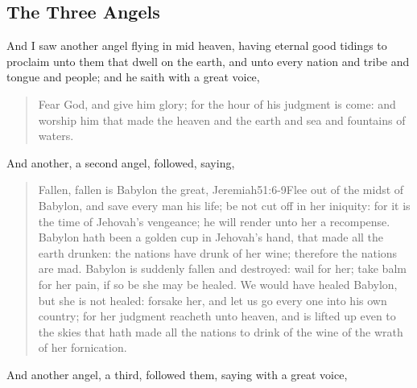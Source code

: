 \subsection*{The Three Angels}
And I saw another angel flying in mid heaven, having eternal good tidings to proclaim unto them that dwell on the earth, and unto every nation and tribe and tongue and people; 
and he saith with a great voice,
\begin{quote}
Fear God, and give him glory; for the hour of his judgment is come: and worship him that made the heaven and the earth and sea and fountains of waters.
\end{quote}
And another, a second angel, followed, saying,
\begin{quote}
Fallen, fallen is Babylon the great,%
				  {Jeremiah}{51:6-9}{Flee out of the midst of Babylon, and save every man his life; be not cut off in her iniquity: for it is the time of Jehovah’s vengeance; he will render unto her a recompense. Babylon hath been a golden cup in Jehovah’s hand, that made all the earth drunken: the nations have drunk of her wine; therefore the nations are mad. Babylon is suddenly fallen and destroyed: wail for her; take balm for her pain, if so be she may be healed. We would have healed Babylon, but she is not healed: forsake her, and let us go every one into his own country; for her judgment reacheth unto heaven, and is lifted up even to the skies} %
that hath made all the nations to drink of the wine of the wrath of her fornication.
\end{quote}
And another angel, a third, followed them, saying with a great voice, 

